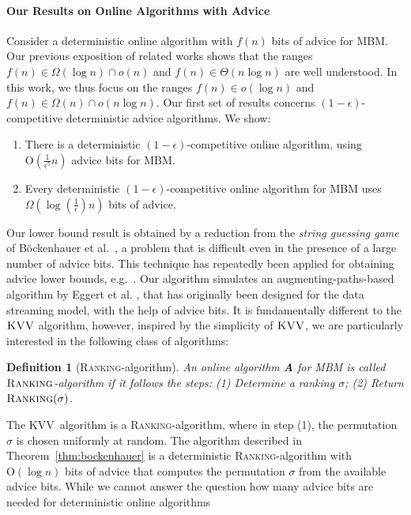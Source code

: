 \documentclass[a4paper]{article}
\newcommand{\Order}{\mathrm{O}}
\newcommand{\Rank}{\textsc{Ranking}}
\newcommand{\KVV}{\textsc{KVV}}
\newtheorem{definition}{Definition}
\begin{document}
\paragraph*{Our Results on Online Algorithms with Advice}
Consider a deterministic online algorithm with $f(n)$ bits of advice for \textsc{MBM}. Our previous exposition
of related works shows that the ranges $f(n) \in \Omega(\log n) \cap o(n)$ and $f(n) \in \Theta(n \log n)$
are well understood. In this work, we thus focus on the ranges
$f(n) \in o(\log n)$ and $f(n) \in \Omega(n) \cap o(n \log n)$. Our first set of results concerns
$(1-\epsilon)$-competitive deterministic advice algorithms. We show:
\begin{enumerate}
 \item There is a deterministic $(1-\epsilon)$-competitive online algorithm, using
 $\Order(\frac{1}{\epsilon^5} n)$ advice bits for \textsc{MBM}.

 \item Every deterministic $(1-\epsilon)$-competitive online algorithm for \textsc{MBM} uses
 $\Omega(\log (\frac{1}{\epsilon}) n)$ bits of advice.
\end{enumerate}
Our lower bound result is obtained by a reduction from the {\em string guessing game} of B\"{o}ckenhauer et
al.~\cite{bhkkss14}, a problem that is difficult even in the presence of a large number of advice bits.
This technique has repeatedly been applied for obtaining advice lower bounds, e.g.\ \cite{arrs13,GuptaKL13,BoyarKLL14,adkrr15,BoyarKLL16,BianchiBBKP16}.
Our algorithm simulates an augmenting-paths-based algorithm by Eggert et al. \cite{ekms11}, that has originally
been designed for the data streaming model, with the help of advice bits.
It is fundamentally
different to the $\KVV$ algorithm, however, inspired by the simplicity of $\KVV$, we are particularly interested in
the following class of algorithms:
\begin{definition}[\textsc{Ranking}-algorithm]
 An online algorithm \textbf{A} for \textsc{MBM} is called $\Rank$-algorithm if it follows the
 steps: (1) Determine a ranking $\sigma$; (2) Return $\Rank(\sigma)$.
\end{definition}
The \KVV~algorithm is a \Rank-algorithm, where in step (1), the permutation $\sigma$ is chosen uniformly
at random. The algorithm
described in Theorem~\ref{thm:bockenhauer} is a deterministic \Rank-algorithm with $\Order(\log n)$ bits
of advice that computes the permutation $\sigma$ from the available advice bits.
While we cannot answer the question how many advice bits are needed for deterministic online algorithms
\end{document}
